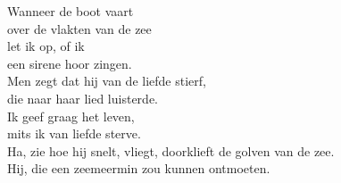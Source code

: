 \clearpage
\begin{translation}
Wanneer de boot vaart\\
over de vlakten van de zee\\
let ik op, of ik\\
een sirene hoor zingen.\\
Men zegt dat hij van de liefde stierf,\\
die naar haar lied luisterde.\\
Ik geef graag het leven,\\
mits ik van liefde sterve.\\
Ha, zie hoe hij snelt, vliegt, doorklieft de golven van de zee.\\
Hij, die een zeemeermin zou kunnen ontmoeten.\\
\end{translation}
